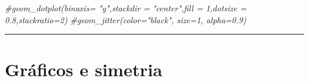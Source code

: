 \documentclass[
]{book}
\newenvironment{Shaded}{\begin{snugshade}}{\end{snugshade}}
\newcommand{\CommentTok}[1]{\textcolor[rgb]{0.56,0.35,0.01}{\textit{#1}}}
\begin{document}
\begin{Shaded}
\begin{Highlighting}[]
  \CommentTok{\#geom\_dotplot(binaxis= "y",stackdir = "center",fill = 1,dotsize = 0.8,stackratio=2)}
  \CommentTok{\#geom\_jitter(color="black", size=1, alpha=0.9)}
\end{Highlighting}
\end{Shaded}

\begin{center}\rule{0.5\linewidth}{0.5pt}\end{center}

\section{Gráficos e simetria}\label{gruxe1ficos-e-simetria}
\end{document}
